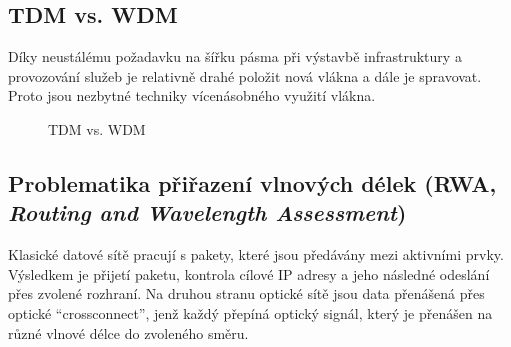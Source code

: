 \subsection{TDM vs. WDM}
Díky neustálému požadavku na šířku pásma při výstavbě infrastruktury a provozování služeb je relativně drahé položit nová vlákna a dále je
spravovat. Proto jsou nezbytné techniky vícenásobného využití vlákna.

\begin{figure}[htbp]
    \centering
    \hfill
    \caption{TDM vs. WDM}
\end{figure}

\subsection{Problematika přiřazení vlnových délek (RWA, \emph{Routing and Wavelength Assessment})}
Klasické datové sítě pracují s pakety, které jsou předávány mezi aktivními prvky. Výsledkem je přijetí paketu, kontrola cílové IP adresy a jeho následné odeslání přes zvolené rozhraní. Na druhou stranu optické sítě jsou data přenášená přes optické \enquote{crossconnect}, jenž každý přepíná optický signál, který je přenášen na různé vlnové délce do zvoleného směru.


